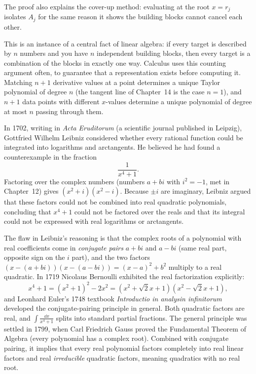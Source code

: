 The proof also explains the cover-up method: evaluating at the root $x = r_j$
isolates $A_j$ for the same reason it shows the building blocks cannot cancel
each other.

\begin{connectionbox}
This is an instance of a central fact of linear algebra: if every target is
described by $n$ numbers and you have $n$ independent building blocks, then
every target is a combination of the blocks in exactly one way. Calculus uses
this counting argument often, to guarantee that a representation exists before
computing it. Matching $n+1$ derivative values at a point determines a unique
Taylor polynomial of degree $n$ (the tangent line of Chapter~14 is the case
$n=1$), and $n+1$ data points with different $x$-values determine
a unique polynomial of degree at most $n$ passing through them.
\end{connectionbox}

\begin{historybox}
In 1702, writing in \emph{Acta Eruditorum} (a scientific journal published in
Leipzig), Gottfried Wilhelm Leibniz considered
whether every rational function could be integrated into logarithms and arctangents.
He believed he had found a counterexample in the fraction
\[
  \frac{1}{x^4 + 1}.
\]
Factoring over the complex numbers (numbers $a+bi$ with $i^2=-1$, met in
Chapter~12) gives $(x^2 + i)(x^2 - i)$. Because $\pm i$ are
imaginary, Leibniz argued that these factors could not be combined into real
quadratic polynomials, concluding that $x^4 + 1$ could not be factored over the
reals and that its integral could not be expressed with real logarithms or arctangents.

The flaw in Leibniz's reasoning is that the complex roots of a polynomial with
real coefficients come in \emph{conjugate pairs} $a+bi$ and $a-bi$ (same real
part, opposite sign on the $i$ part), and the two factors
$(x-(a+bi))(x-(a-bi)) = (x-a)^2+b^2$ multiply to a real quadratic. In 1719
Nicolaus Bernoulli exhibited the real factorization explicitly:
\[
  x^4 + 1 = (x^2 + 1)^2 - 2x^2 = (x^2 + \sqrt{2}x + 1)(x^2 - \sqrt{2}x + 1),
\]
and Leonhard Euler's 1748 textbook \emph{Introductio in analysin infinitorum}
developed the conjugate-pairing principle in general.
Both quadratic factors are real, and $\int \frac{\dd x}{x^4+1}$ splits into standard
partial fractions. The general principle was settled in 1799, when Carl Friedrich
Gauss proved the Fundamental Theorem of Algebra (every polynomial has a complex
root). Combined with conjugate pairing, it implies that every real polynomial
factors completely into real linear factors and real \emph{irreducible}
quadratic factors, meaning quadratics with no real root.
\end{historybox}

